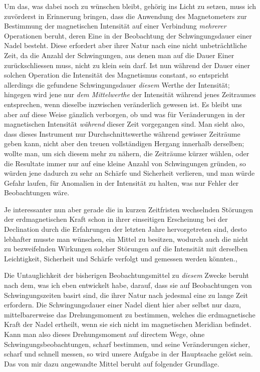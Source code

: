 Um das, was dabei noch zu wünschen bleibt, gehörig ins Licht zu setzen, muss ich zuvörderst in Erinnerung bringen, dass die Anwendung des Magnetometers zur Bestimmung der magnetischen Intensität auf einer Verbindung \textit{mehrerer} Operationen beruht, deren Eine in der Beobachtung der Schwingungsdauer einer Nadel besteht. Diese erfordert aber ihrer Natur nach eine nicht unbeträchtliche Zeit, da die Anzahl der Schwingungen, aus denen man auf die Dauer Einer zurückschliessen muss, nicht zu klein sein darf. Ist nun während der Dauer einer solchen Operation die Intensität des Magnetismus constant, so entspricht allerdings die gefundene Schwingungsdauer \textit{diesem} Werthe der Intensität; hingegen wird jene nur \textit{dem Mittelwerthe} der Intensität während jenes Zeitraumes entsprechen, wenn dieselbe inzwischen veränderlich gewesen ist. Es bleibt uns aber auf diese Weise gänzlich verborgen, ob und was für Veränderungen in der magnetischen Intensität \textit{während} dieser Zeit vorgegangen sind. Man sieht also, dass dieses Instrument nur Durchschnittswerthe während gewisser Zeiträume geben kann, nicht aber den treuen vollständigen Hergang innerhalb derselben; wollte man, um sich diesem mehr zu nähern, die Zeiträume kürzer wählen, oder die Resultate immer nur auf eine kleine Anzahl von Schwingungen gründen, so würden jene dadurch zu sehr an Schärfe und Sicherheit verlieren, und man würde Gefahr laufen, für Anomalien in der Intensität zu halten, was nur Fehler der Beobachtungen wäre.

Je interessanter nun aber gerade die in kurzen Zeitfristen wechselnden Störungen der erdmagnetischen Kraft schon in ihrer einseitigen Erscheinung bei der Declination durch die Erfahrungen der letzten Jahre hervorgetreten sind, desto lebhafter musste man wünschen, ein Mittel zu besitzen, wodurch auch die nicht
zu bezweifelnden Wirkungen solcher Störungen auf die Intensität mit derselben Leichtigkeit, Sicherheit und Schärfe verfolgt und gemessen werden könnten.,

Die Untauglichkeit der bisherigen Beobachtungsmittel zu \textit{diesem} Zwecke beruht nach dem, was ich eben entwickelt habe, darauf, dass sie auf Beobachtungen von Schwingungszeiten basirt sind, die ihrer Natur nach jedesmal eine zu lange Zeit erfordern. Die Schwingungsdauer einer Nadel dient hier aber selbst nur dazu, mittelbarerweise das Drehungsmoment zu bestimmen, welches die erdmagnetische Kraft der Nadel ertheilt, wenn sie sich nicht im magnetischen Meridian befindet. Kann man also dieses Drehungsmoment auf directem Wege, ohne Schwingungsbeobachtungen, scharf bestimmen, und seine Veränderungen sicher, scharf und schnell messen, so wird unsere Aufgabe in der Hauptsache gelöst sein. Das von mir dazu angewandte Mittel beruht auf folgender Grundlage.

